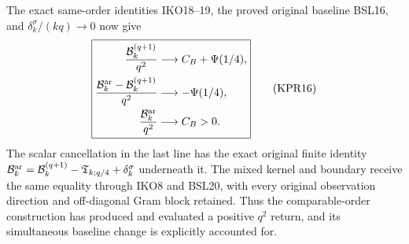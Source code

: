 The exact same-order identities IKO18--19, the proved original
baseline BSL16, and $\delta_k^\sigma/(kq)\to0$ now give
\[
 \boxed{\begin{aligned}
 \frac{\mathcal B_k^{(q+1)}}{q^2}&\longrightarrow C_B+\Psi(1/4),\\
 \frac{\mathcal B_k^{\rm ar}-\mathcal B_k^{(q+1)}}{q^2}
       &\longrightarrow-\Psi(1/4),\\
 \frac{\mathcal B_k^{\rm ar}}{q^2}&\longrightarrow C_B>0.
 \end{aligned}}
 \tag{KPR16}
\]
The scalar cancellation in the last line has the exact original
finite identity
$\mathcal B_k^{\rm ar}=\mathcal B_k^{(q+1)}
 -\mathfrak T_{k;q/4}+\delta_k^\sigma$ underneath it.
The mixed kernel and boundary receive the same equality through
IKO8 and BSL20, with every original observation direction and
off-diagonal Gram block retained. Thus the comparable-order
construction has produced and evaluated a positive $q^2$ return,
and its simultaneous baseline change is explicitly accounted for.

